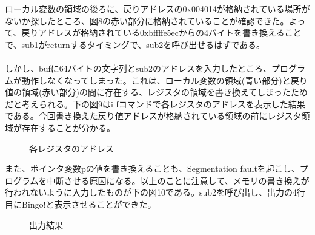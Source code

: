 \documentclass[dvipdfmx,autodetect-engine,titlepage]{jsarticle}
\begin{document}
ローカル変数の領域の後ろに、戻りアドレスの0x004014が格納されている場所がないか探したところ、図8の赤い部分に格納されていることが確認できた。よって、戻りアドレスが格納されている0xbffffe5ecからの4バイトを書き換えることで、sub1がreturnするタイミングで、sub2を呼び出せるはずである。\\\\
しかし、bufに64バイトの文字列とsub2のアドレスを入力したところ、プログラムが動作しなくなってしまった。これは、ローカル変数の領域(青い部分)と戻り値の領域(赤い部分)の間に存在する、レジスタの領域を書き換えてしまったためだと考えられる。下の図9はi fコマンドで各レジスタのアドレスを表示した結果である。今回書き換えた戻り値アドレスが格納されている領域の前にレジスタ領域が存在することが分かる。\\
\begin{figure}[H]
  \centering
  \caption{各レジスタのアドレス}\label{fig:図13}
\end{figure}

また、ポインタ変数pの値を書き換えることも、Segmentation faultを起こし、プログラムを中断させる原因になる。以上のことに注意して、メモリの書き換えが行われないように入力したものが下の図10である。sub2を呼び出し、出力の4行目にBingo!と表示させることができた。\\
\begin{figure}[H]
  \centering
  \caption{出力結果}\label{fig:図14}
\end{figure}
\end{document}
